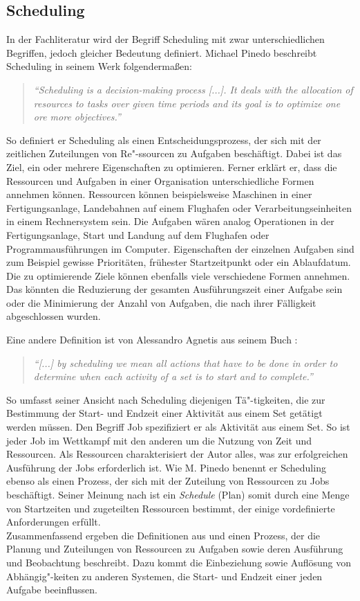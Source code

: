 \subsection{Scheduling}\label{s:scheduling}
In der Fachliteratur wird der Begriff Scheduling mit zwar unterschiedlichen Begriffen, jedoch gleicher Bedeutung definiert. Michael Pinedo beschreibt Scheduling in seinem Werk \cite{mpinedo} folgendermaßen:
\begin{quote}
\textit{"`Scheduling is a decision-making process [...]. It deals with the allocation of resources to tasks over given time periods and its goal is to optimize one ore more objectives."'}
\end{quote}
So definiert er Scheduling als einen Entscheidungsprozess, der sich mit der zeitlichen Zuteilungen von Re"-ssourcen zu Aufgaben beschäftigt. Dabei ist das Ziel, ein oder mehrere Eigenschaften zu optimieren. Ferner erklärt er, dass die Ressourcen und Aufgaben in einer Organisation unterschiedliche Formen annehmen können. Ressourcen können beispielsweise Maschinen in einer Fertigungsanlage, Landebahnen auf einem Flughafen oder Verarbeitungseinheiten in einem Rechnersystem sein. Die Aufgaben wären analog Operationen in der Fertigungsanlage, Start und Landung auf dem Flughafen oder Programmausführungen im Computer. Eigenschaften der einzelnen Aufgaben sind zum Beispiel gewisse Prioritäten, frühester Startzeitpunkt oder ein Ablaufdatum. Die zu optimierende Ziele können ebenfalls viele verschiedene Formen annehmen. Das könnten die Reduzierung der gesamten Ausführungszeit einer Aufgabe sein oder die Minimierung der Anzahl von Aufgaben, die nach ihrer Fälligkeit abgeschlossen wurden.

Eine andere Definition ist von Alessandro Agnetis aus seinem Buch \cite{aagnetis}:
\begin{quote}
\textit{"`[...] by scheduling we mean all actions that have to be done in order to determine when each activity of a set is to start and to complete."'}
\end{quote}
So umfasst seiner Ansicht nach Scheduling diejenigen Tä"-tigkeiten, die zur Bestimmung der Start- und Endzeit einer Aktivität aus einem Set getätigt werden müssen. Den Begriff Job spezifiziert er als Aktivität aus einem Set. So ist jeder Job im Wettkampf mit den anderen um die Nutzung von Zeit und Ressourcen. Als Ressourcen charakterisiert der Autor alles, was zur erfolgreichen Ausführung der Jobs erforderlich ist. Wie M. Pinedo benennt er Scheduling ebenso als einen Prozess, der sich mit der Zuteilung von Ressourcen zu Jobs beschäftigt. Seiner Meinung nach ist ein \textit{Schedule} (Plan) somit durch eine Menge von Startzeiten und zugeteilten Ressourcen bestimmt, der einige vordefinierte Anforderungen erfüllt.\\
Zusammenfassend ergeben die Definitionen aus \cite{mpinedo} und \cite{aagnetis} einen Prozess, der die Planung und Zuteilungen von Ressourcen zu Aufgaben sowie deren Ausführung und Beobachtung beschreibt. Dazu kommt die Einbeziehung sowie Auflösung von Abhängig"-keiten zu anderen Systemen, die Start- und Endzeit einer jeden Aufgabe beeinflussen.

